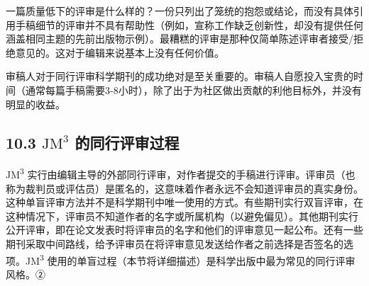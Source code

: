 一篇质量低下的评审是什么样的？一份只列出了笼统的抱怨或结论，而没有具体引用手稿细节的评审并不具有帮助性（例如，宣称工作缺乏创新性，却没有提供任何涵盖相同主题的先前出版物示例）。最糟糕的评审是那种仅简单陈述评审者接受/拒绝意见的。这对于编辑来说基本上没有任何价值。

审稿人对于同行评审科学期刊的成功绝对是至关重要的。审稿人自愿投入宝贵的时间（通常每篇手稿需要3-8小时），除了出于为社区做出贡献的利他目标外，并没有明显的收益。

\subsection*{10.3 $\mathrm{JM}^{3}$ 的同行评审过程}
JM\textsuperscript{3} 实行由编辑主导的外部同行评审，对作者提交的手稿进行评审。评审员（也称为裁判员或评估员）是匿名的，这意味着作者永远不会知道评审员的真实身份。这种单盲评审方法并不是科学期刊中唯一使用的方式。有些期刊实行双盲评审，在这种情况下，评审员不知道作者的名字或所属机构（以避免偏见）。其他期刊实行公开评审，即在论文发表时将评审员的名字和他们的评审意见一起公布。还有一些期刊采取中间路线，给予评审员在将评审意见发送给作者之前选择是否签名的选项。JM\textsuperscript{3} 使用的单盲过程（本节将详细描述）是科学出版中最为常见的同行评审风格。②

